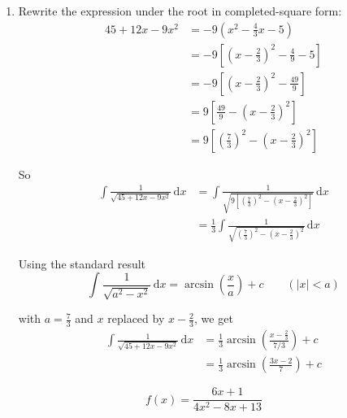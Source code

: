 \documentclass[leqno]{article}
\begin{document}
\begin{enumerate}[
  label=\textbf{\arabic*.},
  leftmargin=*,
  topsep=0pt,
  partopsep=0pt,
  parsep=0pt
]
\begin{djsSolution}
\begin{enumerate}[label=\textbf{(\roman*)}]
with $a=\frac43$ and $x$ replaced by $x+\frac23$, we get
\begin{align*}
\int \frac{1}{9x^2+12x+20}\,\mathrm{d}x
&=\frac19\times\frac{1}{4/3}
\arctan\left(\frac{x+\frac23}{4/3}\right)+c \\
&=\frac{1}{12}\arctan\left(\frac{3x+2}{4}\right)+c
\end{align*}

\item Rewrite the expression under the root in completed-square form:
\begin{align*}
45+12x-9x^2
&=-9\left(x^2-\frac43x-5\right) \\
&=-9\left[\left(x-\frac23\right)^2-\frac49-5\right] \\
&=-9\left[\left(x-\frac23\right)^2-\frac{49}{9}\right] \\
&=9\left[\frac{49}{9}-\left(x-\frac23\right)^2\right] \\
&=9\left[\left(\frac73\right)^2-\left(x-\frac23\right)^2\right]
\end{align*}

So
\begin{align*}
\int \frac{1}{\sqrt{45+12x-9x^2}}\,\mathrm{d}x
&=\int \frac{1}{\sqrt{9\left[\left(\frac73\right)^2-\left(x-\frac23\right)^2\right]}}\,\mathrm{d}x \\
&=\frac13\int \frac{1}{\sqrt{\left(\frac73\right)^2-\left(x-\frac23\right)^2}}\,\mathrm{d}x
\end{align*}

Using the standard result
\[
\int \frac{1}{\sqrt{a^2-x^2}}\,\mathrm{d}x
=
\arcsin\left(\frac{x}{a}\right)+c\qquad (|x|<a)
\]

with $a=\frac73$ and $x$ replaced by $x-\frac23$, we get
\begin{align*}
\int \frac{1}{\sqrt{45+12x-9x^2}}\,\mathrm{d}x
&=\frac13\arcsin\left(\frac{x-\frac23}{7/3}\right)+c \\
&=\frac13\arcsin\left(\frac{3x-2}{7}\right)+c
\end{align*}
\end{enumerate}
\end{djsSolution}


\newpage

\questionitem

\[f(x)=\frac{6x+1}{4x^2-8x+13}\] \\


\end{enumerate}
\end{document}
